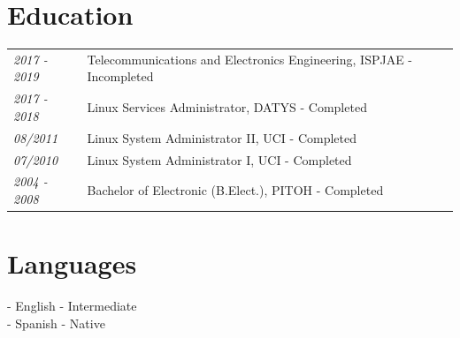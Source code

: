 \documentclass[a4paper,12pt]{article}
\begin{document}
\section{Education}
\begin{tabular}{p{3cm}| p{15cm}}
	\emph{2017 - 2019}  &Telecommunications and Electronics Engineering, ISPJAE - Incompleted \\
	\emph{2017 - 2018}  & Linux Services Administrator, DATYS - Completed \\
	\emph{08/2011}  & Linux System Administrator II, UCI - Completed \\
	\emph{07/2010}  & Linux System Administrator I, UCI - Completed \\
	\emph{2004 - 2008}  & Bachelor of Electronic (B.Elect.), PITOH - Completed \\
\end{tabular}

\section{Languages}
\justify
- English - Intermediate\\
- Spanish - Native


\end{document}
